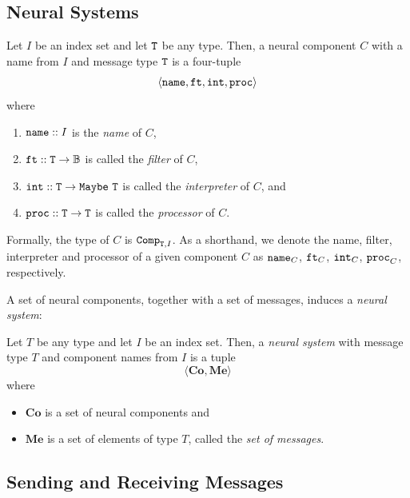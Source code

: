 \subsection{Neural Systems}\label{sec:mathematicalNeuralSystem}

\begin{definition}
	Let $I$ be an index set and let $\mathtt{T}$ be any type. Then, a neural component $C$ with a name from $I$ and message type $\mathtt{T}$ is a four-tuple
	$$
	\langle \mathtt{name}, \mathtt{ft}, \mathtt{int}, \mathtt{proc} \rangle
	$$
	where
	\begin{enumerate}
		\item $\mathtt{name} :: I$ is the {\em name} of $C$,
		\item $\mathtt{ft} :: \mathtt{T \rightarrow \mathbb{B}}$ is  called the {\em filter} of $C$,
		\item $\mathtt{int} :: \mathtt{T} \rightarrow \mathtt{Maybe\ T}$ is called the {\em interpreter} of $C$, and
		\item $\mathtt{proc} :: \mathtt{T} \rightarrow \mathtt{T}$ is called the {\em processor} of $C$.
	\end{enumerate}
	
	Formally, the type of $C$ is $\mathtt{Comp}_{\mathtt{T},I}$. As a shorthand, we denote the name, filter, interpreter and processor of a given component $C$ as $\mathtt{name}_C$, $\mathtt{ft}_C$, $\mathtt{int}_C$, $\mathtt{proc}_C$, respectively.
\end{definition}

\noindent
A set of neural components, together with a set of messages, induces a {\em neural system}:

\begin{definition}
	Let $T$ be any type and let $I$ be an index set. Then, a \emph{neural system} with message type $T$ and component names from $I$ is a tuple
	$$
	\langle \textbf{Co}, \textbf{Me} \rangle
	$$
	where
	\begin{itemize}
		\item $\textbf{Co}$ is a set of neural components  and
		\item $\textbf{Me}$ is a set of elements of type $T$, called the {\em set of messages}.
	\end{itemize}
\end{definition}

\subsection{Sending and Receiving Messages}\label{sec:notation}

